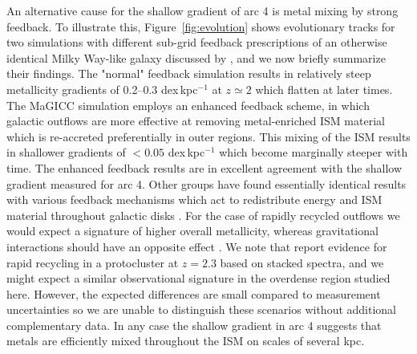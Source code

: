 An alternative cause for the shallow gradient of arc 4 is metal mixing by strong feedback. To illustrate this,
Figure~\ref{fig:evolution} shows evolutionary tracks for two simulations with different sub-grid feedback
prescriptions of an otherwise identical Milky Way-like galaxy discussed by \cite{Gibson2013}, and we now briefly
summarize their findings. The "normal" feedback simulation \citep[MUGS;][]{Stinson2010} results in relatively
steep metallicity gradients of 0.2--0.3 dex\,kpc$^{-1}$ at $z\simeq2$ which flatten at later times. The MaGICC
simulation \citep{Brook2011} employs an enhanced feedback scheme, in which galactic outflows are more effective
at removing metal-enriched ISM material which is re-accreted preferentially in outer regions. This mixing of the
ISM results in shallower gradients of $<0.05$ dex\,kpc$^{-1}$ which become marginally steeper with time. The
enhanced feedback results are in excellent agreement with the shallow gradient measured for arc 4. Other groups
have found essentially identical results with various feedback mechanisms which act to redistribute energy and
ISM material throughout galactic disks \citep[e.g.,][]{Yang2012,Angles-Alcazar2014}. For the case of rapidly
recycled outflows we would expect a signature of higher overall metallicity, whereas gravitational interactions
should have an opposite effect \citep[e.g.,][]{Rich2012}. We note that \cite{Kulas2013} report evidence for rapid
recycling in a protocluster at $z=2.3$ based on stacked spectra, and we might expect a similar observational
signature in the overdense region studied here. However, the expected differences are small \citep[$\sim0.1$
dex;][]{Torrey2012,Kulas2013} compared to measurement uncertainties so we are unable to distinguish these
scenarios without additional complementary data. In any case the shallow gradient in arc 4 suggests that metals
are efficiently mixed throughout the ISM on scales of several kpc.


